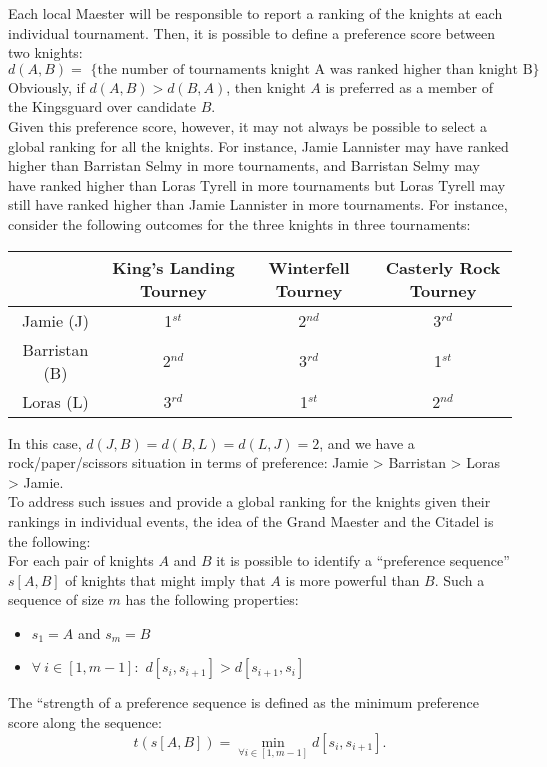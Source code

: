 \documentclass{article}
\begin{document}
\noindent Each local Maester will be responsible to report a ranking
of the knights at each individual tournament. Then, it is possible to
define a preference score between two knights:
$$d(A,B) = \textrm{ \{ the number of tournaments knight A was ranked
  higher than knight B\} }$$ Obviously, if $d(A,B) > d(B,A)$, then
knight $A$ is preferred as a member of the Kingsguard over candidate
$B$.\\

\noindent Given this preference score, however, it may not always be
possible to select a global ranking for all the knights. For instance,
Jamie Lannister may have ranked higher than Barristan Selmy in more
tournaments, and Barristan Selmy may have ranked higher than Loras
Tyrell in more tournaments but Loras Tyrell may still have ranked
higher than Jamie Lannister in more tournaments. For instance,
consider the following outcomes for the three knights in three
tournaments:

\begin{center}
\begin{tabular}{|c|c|c|c|}
\hline
& King's Landing Tourney  & Winterfell Tourney  & Casterly Rock
Tourney\\
\hline
Jamie (J) & 1$^{st}$ & 2$^{nd}$ & 3$^{rd}$\\
Barristan (B) & 2$^{nd}$ & 3$^{rd}$ & 1$^{st}$\\
Loras (L) & 3$^{rd}$ & 1$^{st}$ & 2$^{nd}$\\
\hline
\end{tabular}
\end{center}

\noindent In this case, $d(J,B) = d(B,L) = d(L,J) = 2$, and we have a
rock/paper/scissors situation in terms of preference: Jamie >
Barristan > Loras > Jamie. \\

\noindent To address such issues and provide a global ranking for the
knights given their rankings in individual events, the idea of the
Grand Maester and the Citadel is the following:\\

\noindent For each pair of knights $A$ and $B$ it is possible to
identify a ``preference sequence'' $s[A,B]$ of knights that might
imply that $A$ is more powerful than $B$. Such a sequence of size $m$
has the following properties:
\begin{itemize}
\item $s_1 = A$ and $s_m = B$
\item $\forall\ i \in [1,m-1]:$ $d[s_i,s_{i+1}] > d[s_{i+1},s_i]$
\end{itemize}
\noindent The ``strength of a preference sequence is defined as the
minimum preference score along the sequence: $$ t( s[A,B] ) =
\min_{\forall i \in [1,m-1]} d[s_i,s_{i+1}].$$ 
\end{document}

